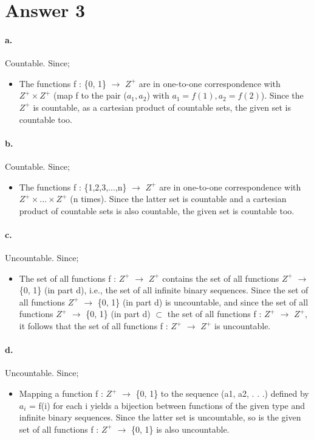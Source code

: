 \documentclass[11pt]{article}
\begin{document}
\section*{Answer 3}
\paragraph{a.}
Countable. Since;
\begin{itemize}
    \item The functions f : \{0, 1\} $\rightarrow$ $Z^+$ are in one-to-one correspondence with $Z^+\times Z^+$ (map f to the pair ($a_1, a_2$) with $a_1 = f(1), a_2 = f(2)$). Since the $Z^+$ is countable, as a cartesian product of countable sets, the given set is countable too.
\end{itemize}
\paragraph{b.}
Countable. Since;
\begin{itemize}
    \item The functions f : \{1,2,3,...,n\} $\rightarrow$ $Z^+$ are in one-to-one correspondence with $Z^+\times ... \times Z^+$ (n times). Since the latter set is countable and a cartesian product of countable sets is also countable, the given set is countable too.
\end{itemize}
\paragraph{c.}
Uncountable. Since;
\begin{itemize}
    \item The set of all functions f : $Z^+$ $\rightarrow$ $Z^+$ contains the set of all functions $Z^+$ $\rightarrow$ \{0, 1\} (in part d), i.e., the set of all infinite binary sequences. Since the set of all functions $Z^+$ $\rightarrow$ \{0, 1\} (in part d) is uncountable, and since the set of all functions $Z^+$ $\rightarrow$ \{0, 1\} (in part d) $\subset$ the set of all functions f : $Z^+$ $\rightarrow$ $Z^+$, it follows that the set of all functions f : $Z^+$ $\rightarrow$ $Z^+$ is uncountable.

\end{itemize}
\paragraph{d.}
Uncountable. Since;
\begin{itemize}
    \item  Mapping a function f : $Z^+$ $\rightarrow$ \{0, 1\} to the sequence (a1, a2, . . .) defined by $a_i$ = f(i) for each i yields a bijection between functions of the given type and infinite binary sequences. Since the latter set is uncountable, so is the given set of all functions f : $Z^+$ $\rightarrow$ \{0, 1\} is also uncountable.

\end{itemize}
\end{document}
